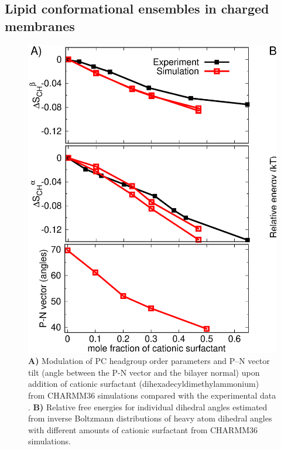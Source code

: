 \documentclass[journal=jpcbfk,manuscript=article]{achemso}
\begin{document}
\subsection{Lipid conformational ensembles in charged membranes}



\begin{figure}[bt]
  \centering
  \includegraphics[width=\textwidth]{./Figs/HGorderparametersPCvsSURFchangeDIHEDRALSlog.eps}
  \caption{\label{changesWITHsurf}
    \textbf{A)} Modulation of PC headgroup order parameters and P--N vector tilt (angle between the P-N vector and the bilayer normal) upon addition of cationic surfactant (dihexadecyldimethylammonium)
    from CHARMM36 simulations compared with the experimental data \cite{scherer89}.
    \textbf{B)} Relative free energies for individual dihedral angles estimated from inverse Boltzmann distributions of heavy atom dihedral angles
    with different amounts of cationic surfactant from CHARMM36 simulations.
  }
\end{figure}
\end{document}
